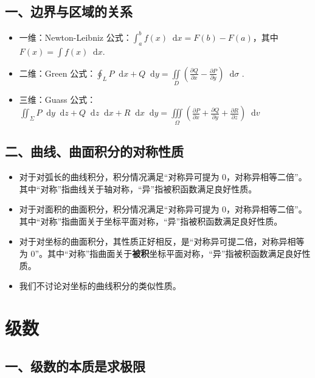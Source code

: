 \documentclass[b5paper]{ctexart}
\renewcommand{\d}{\mathop{}\!\mathrm{d}}
\begin{document}
	\subsection*{一、边界与区域的关系}
	
	\begin{itemize}
		\item 一维：Newton-Leibniz 公式：$\int_{a}^{b} f(x) \d x = F(b) - F(a)$，其中 $F(x) = \int f(x) \d x$.
		
		\item 二维：Green 公式：$\oint_{L} P \d x + Q \d y = \iint \limits_{D} (\frac{\partial Q}{\partial x} - \frac{\partial P}{\partial y}) \d \sigma$ .
		
		\item 三维：Guass 公式：$\iint_ {\Sigma} P \d y \d z + Q \d z \d x + R \d x \d y = \iiint \limits_{\Omega} (\frac{\partial P}{\partial x} + \frac{\partial Q}{\partial y} + \frac{\partial R}{\partial z}) \d v$
	\end{itemize}
	
	\subsection*{二、曲线、曲面积分的对称性质}
	
	\begin{itemize}
		\item 对于对弧长的曲线积分，积分情况满足“对称异可提为 0，对称异相等二倍”。其中“对称”指曲线关于轴对称，“异”指被积函数满足良好性质。
		
		\item 对于对面积的曲面积分，积分情况满足“对称异可提为 0，对称异相等二倍”。其中“对称”指曲面关于坐标平面对称，“异”指被积函数满足良好性质。
		
		\item 对于对坐标的曲面积分，其性质正好相反，是“对称异可提二倍，对称异相等为 0”。其中“对称”指曲面关于\textbf{被积}坐标平面对称，“异”指被积函数满足良好性质。
		
		\item 我们不讨论对坐标的曲线积分的类似性质。
	\end{itemize}
	
	\newpage
	\section{级数}
	
	\subsection*{一、级数的本质是求极限}
	
\end{document}
